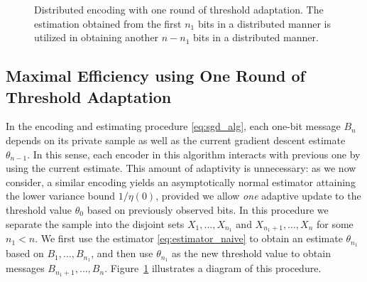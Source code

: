 \begin{figure}
\begin{center}
\end{center}
\caption{Distributed encoding with one round of threshold adaptation. The estimation obtained from the first $n_1$ bits in a distributed manner is utilized in obtaining another $n-n_1$ bits in a distributed manner. 
\label{fig:one_round}
}
\end{figure}

\subsection{Maximal Efficiency using One Round of Threshold Adaptation}


In the encoding and estimating procedure \eqref{eq:sgd_alg}, each one-bit
message $B_n$ depends on its private sample as well as the current gradient
descent estimate $\theta_{n-1}$. In this sense, each encoder in this
algorithm interacts with previous one by using the current estimate.  This
amount of adaptivity is unnecessary: as we now consider, a similar encoding
yields an asymptotically normal estimator attaining the lower variance bound
$1/\eta(0)$, provided we allow \emph{one} adaptive update to the threshold
value $\theta_0$ based on previously observed bits.
%
In this procedure we separate the sample into the disjoint sets
$X_1,\ldots,X_{n_1}$ and $X_{n_1+1},\ldots,X_n$ for some $n_1 < n$.  We
first use the estimator \eqref{eq:estimator_naive} to obtain an estimate
${\theta}_{n_1}$ based on $B_1,\ldots,B_{n_1}$, and then use
${\theta}_{n_1}$ as the new threshold value to obtain messages $B_{n_1+1},
\ldots, B_n$. Figure~\ref{fig:one_round} illustrates a diagram of this
procedure.

